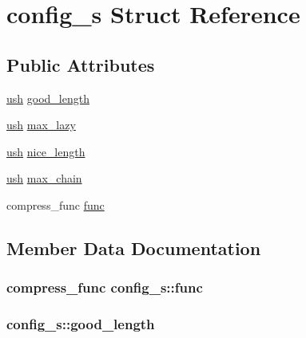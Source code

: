 \hypertarget{structconfig__s}{}\section{config\+\_\+s Struct Reference}
\label{structconfig__s}
\subsection*{Public Attributes}
\begin{DoxyCompactItemize}
\item 
\hyperlink{zutil_8h_a3754180d606d4ed15468d15d9665aa2e}{ush} \hyperlink{structconfig__s_a36152319fbe49bebbc0354f8bcb617a6}{good\+\_\+length}
\item 
\hyperlink{zutil_8h_a3754180d606d4ed15468d15d9665aa2e}{ush} \hyperlink{structconfig__s_afecf50eeeb2afca11ab28d344280231b}{max\+\_\+lazy}
\item 
\hyperlink{zutil_8h_a3754180d606d4ed15468d15d9665aa2e}{ush} \hyperlink{structconfig__s_af2a1e023e10d6e0c9ff64f8c0c4c9894}{nice\+\_\+length}
\item 
\hyperlink{zutil_8h_a3754180d606d4ed15468d15d9665aa2e}{ush} \hyperlink{structconfig__s_ac0ef64600cf4487e3754a21934ffdb89}{max\+\_\+chain}
\item 
compress\+\_\+func \hyperlink{structconfig__s_aea5a0fe31d694079966523a49d60174b}{func}
\end{DoxyCompactItemize}


\subsection{Member Data Documentation}
\hypertarget{structconfig__s_aea5a0fe31d694079966523a49d60174b}{}
\subsubsection[{func}]{\setlength{\rightskip}{0pt plus 5cm}compress\+\_\+func config\+\_\+s\+::func}\label{structconfig__s_aea5a0fe31d694079966523a49d60174b}
\hypertarget{structconfig__s_a36152319fbe49bebbc0354f8bcb617a6}{}
\subsubsection[{good\+\_\+length}]{ config\+\_\+s\+::good\+\_\+length}\label{structconfig__s_a36152319fbe49bebbc0354f8bcb617a6}
\hypertarget{structconfig__s_ac0ef64600cf4487e3754a21934ffdb89}{}
